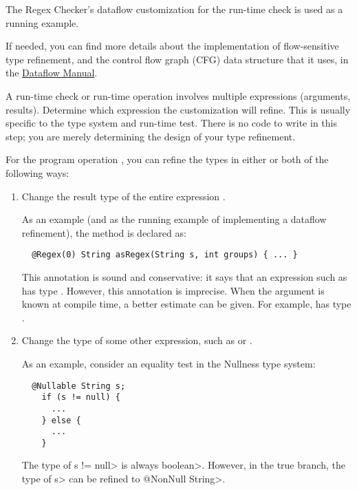 The Regex Checker's dataflow customization for the
run-time check is used as a running example.

If needed, you can find more details about the implementation of
flow-sensitive type refinement, and the control flow graph (CFG) data
structure that it uses, in the
\href{https://checkerframework.org/manual/checker-framework-dataflow-manual.pdf}{Dataflow
  Manual}.



A run-time check or run-time
operation involves multiple expressions (arguments, results).
Determine which expression the customization will refine.  This is
usually specific to the type system and run-time test.
There is no code to write in this step; you are merely determining
the design of your type refinement.

For the program operation , you can refine
the types in either or both of the following ways:
\begin{enumerate}
\item Change the result type of the entire expression .

As an example (and as the running example of implementing a dataflow
refinement), the  method is declared as:

\begin{smaller}
\begin{Verbatim}
  @Regex(0) String asRegex(String s, int groups) { ... }
\end{Verbatim}
\end{smaller}

\noindent
This annotation is sound and conservative:  it says that an expression such
as  has type .  However, this annotation is imprecise.  When the 
argument is known at compile time, a better estimate can be given.  For
example,  has type .

\item Change the type of some other expression, such as  or .

As an example, consider an equality test in the Nullness type system:

\begin{Verbatim}
  @Nullable String s;
    if (s != null) {
      ...
    } else {
      ...
    }
\end{Verbatim}

The type of \<s != null> is always \<boolean>.  However, in the
true branch, the type of \<s> can be refined to \<@NonNull String>.

\end{enumerate}

